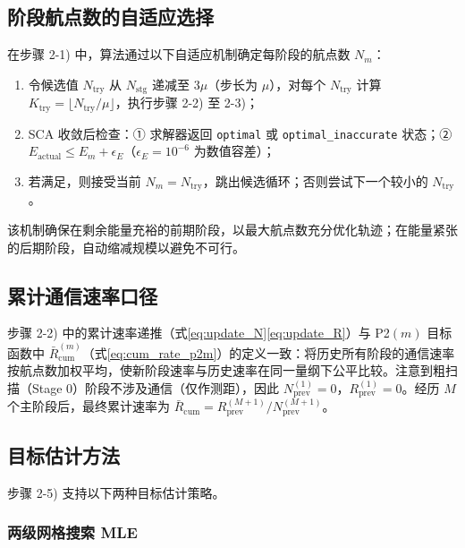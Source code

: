 \subsection{阶段航点数的自适应选择}
\label{sec:adaptive_nm}

在步骤 2-1) 中，算法通过以下自适应机制确定每阶段的航点数 $N_m$：

\begin{enumerate}
    \item 令候选值 $N_{\mathrm{try}}$ 从 $N_{\mathrm{stg}}$ 递减至 $3\mu$（步长为 $\mu$），对每个 $N_{\mathrm{try}}$ 计算 $K_{\mathrm{try}}=\lfloor N_{\mathrm{try}}/\mu\rfloor$，执行步骤 2-2) 至 2-3)；
    \item SCA 收敛后检查：① 求解器返回 \texttt{optimal} 或 \texttt{optimal\_inaccurate} 状态；② $E_{\mathrm{actual}}\leq E_m+\epsilon_E$（$\epsilon_E=10^{-6}$ 为数值容差）；
    \item 若满足，则接受当前 $N_m=N_{\mathrm{try}}$，跳出候选循环；否则尝试下一个较小的 $N_{\mathrm{try}}$。
\end{enumerate}

该机制确保在剩余能量充裕的前期阶段，以最大航点数充分优化轨迹；在能量紧张的后期阶段，自动缩减规模以避免不可行。

\subsection{累计通信速率口径}

步骤 2-2) 中的累计速率递推（式\eqref{eq:update_N}\eqref{eq:update_R}）与 P2$(m)$ 目标函数中 $\bar{R}_{\mathrm{cum}}^{(m)}$（式\eqref{eq:cum_rate_p2m}）的定义一致：将历史所有阶段的通信速率按航点数加权平均，使新阶段速率与历史速率在同一量纲下公平比较。注意到粗扫描（Stage 0）阶段不涉及通信（仅作测距），因此 $N_{\mathrm{prev}}^{(1)}=0$，$R_{\mathrm{prev}}^{(1)}=0$。经历 $M$ 个主阶段后，最终累计速率为 $\bar{R}_{\mathrm{cum}}=R_{\mathrm{prev}}^{(M+1)}\big/N_{\mathrm{prev}}^{(M+1)}$。

\subsection{目标估计方法}
\label{sec:target_estimator}

步骤 2-5) 支持以下两种目标估计策略。

\subsubsection{两级网格搜索 MLE}

